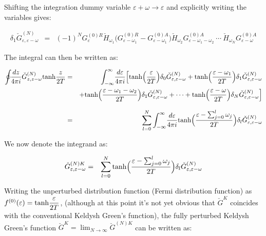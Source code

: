 \documentclass[uplatex,a4j,12pt,dvipdfmx]{jsarticle}
\begin{document}
Shifting the integration dummy variable $\varepsilon + \omega \to \varepsilon$ and explicitly writing the variables gives:

\begin{eqnarray}
	\delta_{1} \check{G}^{(N)}_{\varepsilon , \varepsilon - \omega}
	&=&
	(-1)^{N}
	G^{(0)R}_{\varepsilon }
	\check{H}_{\omega_{1}}
	\Big( G^{(0)R}_{\varepsilon - \omega_{1}} - G^{(0)A}_{\varepsilon - \omega_{1}} \Big)
	\check{H}_{\omega_{2}}
	G^{(0)A}_{\varepsilon - \omega_{1} - \omega_{2} }
	\ \cdots \
	\check{H}_{\omega_{N}}
	G^{(0)A}_{\varepsilon - \omega }
\end{eqnarray}

The integral can then be written as:

\begin{eqnarray}
	\oint \!\! \dfrac{dz}{4 \pi i}
	\check{G}^{(N)}_{z,z - \omega}
	{\rm tanh} \dfrac{z}{2 T}
	&=&
	\int^{\infty}_{-\infty} \! \dfrac{d \varepsilon}{4 \pi i}
	\Big[
	{\rm tanh} \Big( \dfrac{\varepsilon}{2 T} \Big)
	\delta_{0} \check{G}^{(N)}_{\varepsilon , \varepsilon - \omega}
	+
	{\rm tanh} \Big( \dfrac{\varepsilon - \omega_{1}}{2 T} \Big)
	\delta_{1} \check{G}^{(N)}_{\varepsilon , \varepsilon - \omega}
	\nonumber \\ &&
	+
	{\rm tanh} \Big( \dfrac{\varepsilon - \omega_{1} - \omega_{2}}{2 T} \Big)
	\delta_{1} \check{G}^{(N)}_{\varepsilon , \varepsilon - \omega}
	+
	\cdots
	+
	{\rm tanh} \Big( \dfrac{\varepsilon - \omega}{2 T} \Big)
	\delta_{N} \check{G}^{(N)}_{\varepsilon , \varepsilon - \omega}
	\Big]
	\nonumber \\[3mm] &=&
	\sum_{l=0}^{N}
	\int^{\infty}_{-\infty} \! \dfrac{d \varepsilon}{4 \pi i}
	{\rm tanh} \Big( \dfrac{\varepsilon - \sum_{j=0}^{l} \omega_{j} }{2 T} \Big)
	\delta_{l} \check{G}^{(N)}_{\varepsilon , \varepsilon - \omega}
\end{eqnarray}

We now denote the integrand as:

\begin{eqnarray}
	\check{G}^{(N)K}_{\varepsilon , \varepsilon - \omega}
	&=&
	\sum_{l=0}^{N}
	{\rm tanh} \Big( \dfrac{\varepsilon - \sum_{j=0}^{l} \omega_{j} }{2 T} \Big)
	\delta_{l} \check{G}^{(N)}_{\varepsilon , \varepsilon - \omega}
\end{eqnarray}

Writing the unperturbed distribution function (Fermi distribution function) as $f^{(0)}(\varepsilon) = {\rm tanh}\dfrac{\varepsilon}{2 T}$,
(although at this point it's not yet obvious that $\check{G}^{K}$ coincides with the conventional Keldysh Green's function),
the fully perturbed Keldysh Green's function $\check{G}^{K} = \displaystyle \lim_{N \to \infty} \check{G}^{(N)K}$ can be written as:
\end{document}
